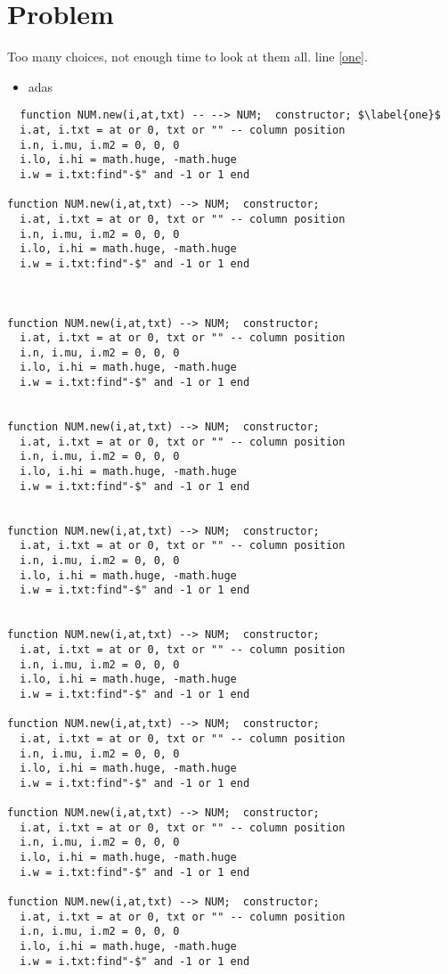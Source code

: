 \documentclass[twocolumn,landscape]{book}
\begin{document}
\section{Problem}
Too many choices, not enough time to look at them all.
line \ref{one}.
\begin{itemize} 
\item adas
\end{itemize}
\clearpage
\begin{verbatim}
  function NUM.new(i,at,txt) -- --> NUM;  constructor; $\label{one}$
  i.at, i.txt = at or 0, txt or "" -- column position 
  i.n, i.mu, i.m2 = 0, 0, 0
  i.lo, i.hi = math.huge, -math.huge 
  i.w = i.txt:find"-$" and -1 or 1 end

function NUM.new(i,at,txt) --> NUM;  constructor; 
  i.at, i.txt = at or 0, txt or "" -- column position 
  i.n, i.mu, i.m2 = 0, 0, 0
  i.lo, i.hi = math.huge, -math.huge 
  i.w = i.txt:find"-$" and -1 or 1 end



function NUM.new(i,at,txt) --> NUM;  constructor; 
  i.at, i.txt = at or 0, txt or "" -- column position 
  i.n, i.mu, i.m2 = 0, 0, 0
  i.lo, i.hi = math.huge, -math.huge 
  i.w = i.txt:find"-$" and -1 or 1 end


function NUM.new(i,at,txt) --> NUM;  constructor; 
  i.at, i.txt = at or 0, txt or "" -- column position 
  i.n, i.mu, i.m2 = 0, 0, 0
  i.lo, i.hi = math.huge, -math.huge 
  i.w = i.txt:find"-$" and -1 or 1 end


function NUM.new(i,at,txt) --> NUM;  constructor; 
  i.at, i.txt = at or 0, txt or "" -- column position 
  i.n, i.mu, i.m2 = 0, 0, 0
  i.lo, i.hi = math.huge, -math.huge 
  i.w = i.txt:find"-$" and -1 or 1 end


function NUM.new(i,at,txt) --> NUM;  constructor; 
  i.at, i.txt = at or 0, txt or "" -- column position 
  i.n, i.mu, i.m2 = 0, 0, 0
  i.lo, i.hi = math.huge, -math.huge 
  i.w = i.txt:find"-$" and -1 or 1 end

function NUM.new(i,at,txt) --> NUM;  constructor; 
  i.at, i.txt = at or 0, txt or "" -- column position 
  i.n, i.mu, i.m2 = 0, 0, 0
  i.lo, i.hi = math.huge, -math.huge 
  i.w = i.txt:find"-$" and -1 or 1 end

function NUM.new(i,at,txt) --> NUM;  constructor; 
  i.at, i.txt = at or 0, txt or "" -- column position 
  i.n, i.mu, i.m2 = 0, 0, 0
  i.lo, i.hi = math.huge, -math.huge 
  i.w = i.txt:find"-$" and -1 or 1 end

function NUM.new(i,at,txt) --> NUM;  constructor; 
  i.at, i.txt = at or 0, txt or "" -- column position 
  i.n, i.mu, i.m2 = 0, 0, 0
  i.lo, i.hi = math.huge, -math.huge 
  i.w = i.txt:find"-$" and -1 or 1 end


\end{verbatim}
\end{document}

